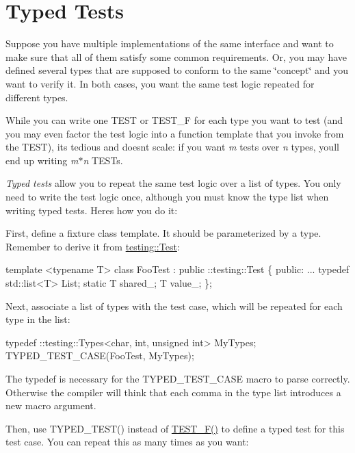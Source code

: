 \section*{Typed Tests}

Suppose you have multiple implementations of the same interface and want to make sure that all of them satisfy some common requirements. Or, you may have defined several types that are supposed to conform to the same \char`\"{}concept\char`\"{} and you want to verify it. In both cases, you want the same test logic repeated for different types.

While you can write one {\ttfamily T\+E\+ST} or {\ttfamily T\+E\+S\+T\+\_\+F} for each type you want to test (and you may even factor the test logic into a function template that you invoke from the {\ttfamily T\+E\+ST}), it\textquotesingle{}s tedious and doesn\textquotesingle{}t scale\+: if you want {\itshape m} tests over {\itshape n} types, you\textquotesingle{}ll end up writing {\itshape m$\ast$n} {\ttfamily T\+E\+ST}s.

{\itshape Typed tests} allow you to repeat the same test logic over a list of types. You only need to write the test logic once, although you must know the type list when writing typed tests. Here\textquotesingle{}s how you do it\+:

First, define a fixture class template. It should be parameterized by a type. Remember to derive it from {\ttfamily \hyperlink{classtesting_1_1_test}{testing\+::\+Test}}\+:


\begin{DoxyCode}
template <typename T>
class FooTest : public ::testing::Test \{
 public:
  ...
  typedef std::list<T> List;
  static T shared\_;
  T value\_;
\};
\end{DoxyCode}


Next, associate a list of types with the test case, which will be repeated for each type in the list\+:


\begin{DoxyCode}
typedef ::testing::Types<char, int, unsigned int> MyTypes;
TYPED\_TEST\_CASE(FooTest, MyTypes);
\end{DoxyCode}


The {\ttfamily typedef} is necessary for the {\ttfamily T\+Y\+P\+E\+D\+\_\+\+T\+E\+S\+T\+\_\+\+C\+A\+SE} macro to parse correctly. Otherwise the compiler will think that each comma in the type list introduces a new macro argument.

Then, use {\ttfamily T\+Y\+P\+E\+D\+\_\+\+T\+E\+S\+T()} instead of {\ttfamily \hyperlink{test__tracker_8cpp_a567724948cdce4788a1e8c8baf6b6cfe}{T\+E\+S\+T\+\_\+\+F()}} to define a typed test for this test case. You can repeat this as many times as you want\+:


